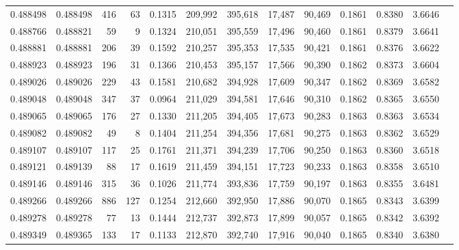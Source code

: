 \begin{tabular}{rrrrrrrrrrrrr}
0.488498 & 0.488498 &   416 &    63 &                                     0.1315 & 209,992 & 395,618 &  17,487 &  90,469 & 0.1861 & 0.8380 & 3.6646 \\
0.488766 & 0.488821 &    59 &     9 &                                     0.1324 & 210,051 & 395,559 &  17,496 &  90,460 & 0.1861 & 0.8379 & 3.6641 \\
0.488881 & 0.488881 &   206 &    39 &                                     0.1592 & 210,257 & 395,353 &  17,535 &  90,421 & 0.1861 & 0.8376 & 3.6622 \\
0.488923 & 0.488923 &   196 &    31 &                                     0.1366 & 210,453 & 395,157 &  17,566 &  90,390 & 0.1862 & 0.8373 & 3.6604 \\
0.489026 & 0.489026 &   229 &    43 &                                     0.1581 & 210,682 & 394,928 &  17,609 &  90,347 & 0.1862 & 0.8369 & 3.6582 \\
0.489048 & 0.489048 &   347 &    37 &                                     0.0964 & 211,029 & 394,581 &  17,646 &  90,310 & 0.1862 & 0.8365 & 3.6550 \\
0.489065 & 0.489065 &   176 &    27 &                                     0.1330 & 211,205 & 394,405 &  17,673 &  90,283 & 0.1863 & 0.8363 & 3.6534 \\
0.489082 & 0.489082 &    49 &     8 &                                     0.1404 & 211,254 & 394,356 &  17,681 &  90,275 & 0.1863 & 0.8362 & 3.6529 \\
0.489107 & 0.489107 &   117 &    25 &                                     0.1761 & 211,371 & 394,239 &  17,706 &  90,250 & 0.1863 & 0.8360 & 3.6518 \\
0.489121 & 0.489139 &    88 &    17 &                                     0.1619 & 211,459 & 394,151 &  17,723 &  90,233 & 0.1863 & 0.8358 & 3.6510 \\
0.489146 & 0.489146 &   315 &    36 &                                     0.1026 & 211,774 & 393,836 &  17,759 &  90,197 & 0.1863 & 0.8355 & 3.6481 \\
0.489266 & 0.489266 &   886 &   127 &                                     0.1254 & 212,660 & 392,950 &  17,886 &  90,070 & 0.1865 & 0.8343 & 3.6399 \\
0.489278 & 0.489278 &    77 &    13 &                                     0.1444 & 212,737 & 392,873 &  17,899 &  90,057 & 0.1865 & 0.8342 & 3.6392 \\
0.489349 & 0.489365 &   133 &    17 &                                     0.1133 & 212,870 & 392,740 &  17,916 &  90,040 & 0.1865 & 0.8340 & 3.6380 \\

\end{tabular}
